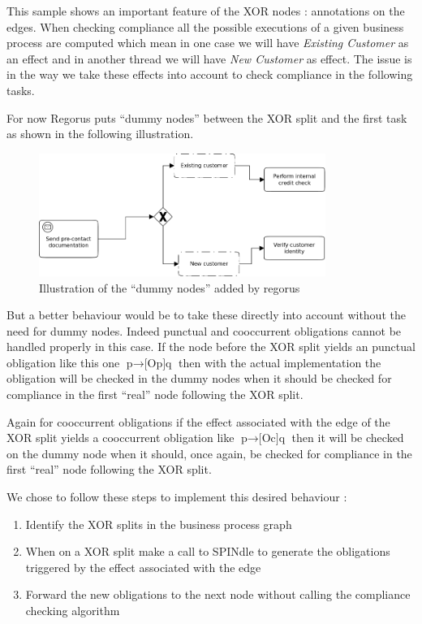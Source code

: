 \documentclass[10pt]{report}
\begin{document}
This sample shows an important feature of the XOR nodes : annotations on the edges. When checking compliance all the possible executions of a given business process are computed which mean in one case we will have \textit{Existing Customer} as an effect and in another thread we will have \textit{New Customer} as effect. The issue is in the way we take these effects into account to check compliance in the following tasks.

For now Regorus puts \enquote{dummy nodes} between the XOR split and the first task as shown in the following illustration.
\begin{figure}[!h] %
\begin{center}
\includegraphics[height=4cm]{XOR2.png} %
\caption{Illustration of the \enquote{dummy nodes} added by regorus} %
\end{center}
\label{image_soleil} %
\end{figure} %

But a better behaviour would be to take these directly into account without the need for dummy nodes. Indeed punctual and cooccurrent obligations cannot be handled properly in this case. If the node before the XOR split yields an punctual obligation like this one $\text{p} \rightarrow \text{[Op]q}$ then with the actual implementation the obligation will be checked in the dummy nodes when it should be checked for compliance in the first \enquote{real} node following the XOR split.

Again for cooccurrent obligations if the effect associated with the edge of the XOR split yields a cooccurrent obligation like $\text{p} \rightarrow \text{[Oc]q}$ then it will be checked on the dummy node when it should, once again, be checked for compliance in the first \enquote{real} node following the XOR split.

We chose to follow these steps to implement this desired behaviour :
\begin{enumerate}
\item Identify the XOR splits in the business process graph
\item When on a XOR split make a call to SPINdle to generate the obligations triggered by the effect associated with the edge
\item Forward the new obligations to the next node without calling the compliance checking algorithm
\end{enumerate}
\end{document}
